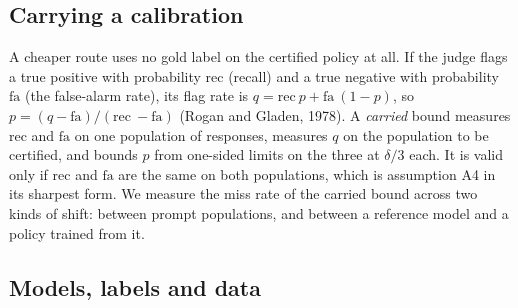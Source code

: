 \documentclass[11pt]{article}
\begin{document}
\subsection{Carrying a calibration}

A cheaper route uses no gold label on the certified policy at all. If the judge flags a true positive with probability $\text{rec}$ (recall) and a true negative with probability $\text{fa}$ (the false-alarm rate), its flag rate is $q = \text{rec}\ p + \text{fa}\ (1 - p )$, so $p = (q - \text{fa}) / (\text{rec}\ - \text{fa})$ (Rogan and Gladen, 1978). A \emph{carried} bound measures $\text{rec}$ and $\text{fa}$ on one population of responses, measures $q$ on the population to be certified, and bounds $p$ from one-sided limits on the three at $\delta / 3$ each. It is valid only if $\text{rec}$ and $\text{fa}$ are the same on both populations, which is assumption A4 in its sharpest form. We measure the miss rate of the carried bound across two kinds of shift: between prompt populations, and between a reference model and a policy trained from it.


\subsection{Models, labels and data}
\end{document}
